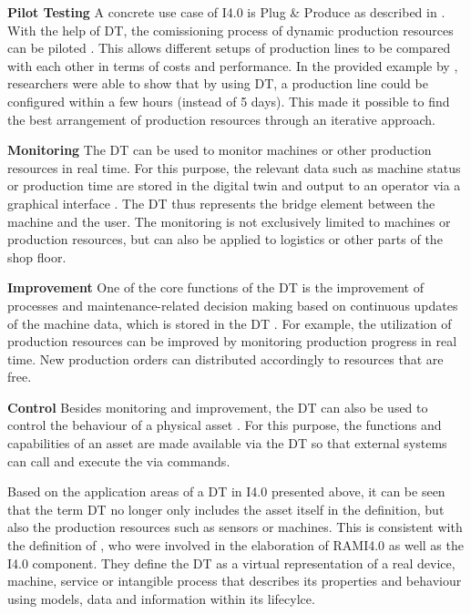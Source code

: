 \textbf{Pilot Testing} A concrete use case of \ac{I4.0} is Plug \& Produce as described in \cite{Schleipen2015Requirements4.0}. With the help of \ac{DT}, the comissioning process of dynamic production resources can be piloted \cite[p. 9]{Son2021PastManufacturing}. This allows different setups of production lines to be compared with each other in terms of costs and performance. In the provided example by \citet{Son2021PastManufacturing}, researchers were able to show that by using \ac{DT}, a production line could be configured within a few hours (instead of 5 days). This made it possible to find the best arrangement of production resources through an iterative approach. 

\textbf{Monitoring} The \ac{DT} can be used to monitor machines or other production resources in real time. For this purpose, the relevant data such as machine status or production time are stored in the digital twin and output to an operator via a graphical interface \cite[p. 11]{Son2021PastManufacturing}. The \ac{DT} thus represents the bridge element between the machine and the user. The monitoring is not exclusively limited to machines or production resources, but can also be applied to logistics or other parts of the shop floor. 

\textbf{Improvement} One of the core functions of the \ac{DT} is the improvement of processes and maintenance-related decision making based on continuous updates of the machine data, which is stored in the \ac{DT} \cite[p. 14]{Son2021PastManufacturing}. For example, the utilization of production resources can be improved by monitoring production progress in real time. New production orders can distributed accordingly to resources that are free. 

\textbf{Control} Besides monitoring and improvement, the \ac{DT} can also be used to control the behaviour of a  physical asset \cite[p. 15]{Son2021PastManufacturing}. For this purpose, the functions and capabilities of an asset are made available via the \ac{DT} so that external systems can call and execute the via commands.  

Based on the application areas of a \ac{DT} in \ac{I4.0} presented above, it can be seen that the term \ac{DT} no longer only includes the asset itself in the definition, but also the production resources such as sensors or machines. This is consistent with the definition of \cite[p. 1]{Stark2020WiGep-PositonTwin}, who were involved in the elaboration of \ac{RAMI4.0} as well as the \ac{I4.0} component. They define the \ac{DT} as a virtual representation of a real device, machine, service or intangible process that describes its properties and behaviour using models, data and information within its lifecylce.

